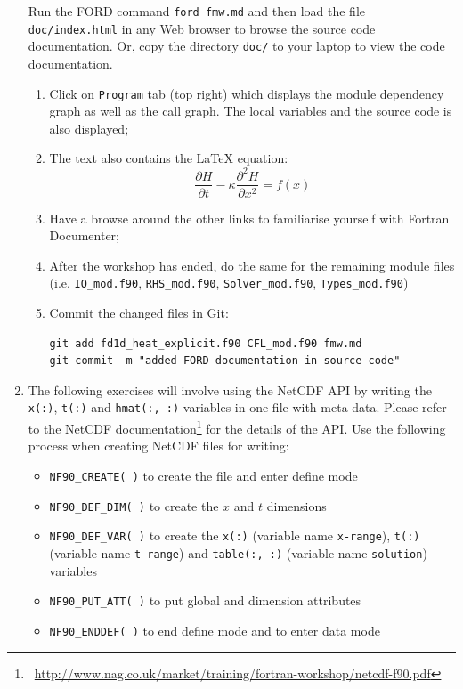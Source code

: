 \documentclass[12pt]{article}
\begin{document}
\begin{enumerate}
Run the FORD command \texttt{ford fmw.md} and then load the file \texttt{doc/index.html} in any Web browser
to browse the source code documentation. Or, copy the directory \texttt{doc/} to your laptop to view the
code documentation.
\begin{enumerate}
\item Click on \texttt{Program} tab (top right) which displays the module dependency graph as well as the call graph. The
  local variables and the source code is also displayed;
\item The text also contains the LaTeX equation:
\begin{equation}
\frac{\partial H}{\partial t} - \kappa\frac{\partial^{2} H}{\partial x^{2}} = f(x)
\end{equation}
\item Have a browse around the other links to familiarise yourself with Fortran Documenter;
\item After the workshop has ended, do the same for the remaining module files 
(i.e. \texttt{IO\_mod.f90}, \texttt{RHS\_mod.f90}, \texttt{Solver\_mod.f90}, \texttt{Types\_mod.f90})
\item Commit the changed files in Git:
\begin{verbatim}
git add fd1d_heat_explicit.f90 CFL_mod.f90 fmw.md
git commit -m "added FORD documentation in source code"
\end{verbatim}
\end{enumerate}
\item The following exercises will involve using the NetCDF API by writing the
  \texttt{x(:)}, \texttt{t(:)} and \texttt{hmat(:, :)} variables in one file with meta-data. 
Please refer to the NetCDF documentation\footnote{~\url{http://www.nag.co.uk/market/training/fortran-workshop/netcdf-f90.pdf}} for the details of the API. Use the following process when creating NetCDF files for writing:
\begin{itemize}
\item\texttt{NF90\_CREATE( )} to create the file and enter define mode
\item\texttt{NF90\_DEF\_DIM( )} to create the $x$ and $t$ dimensions
\item\texttt{NF90\_DEF\_VAR( )} to create the \texttt{x(:)} (variable name \texttt{x-range}), \texttt{t(:)} (variable name
  \texttt{t-range}) and \texttt{table(:, :)} (variable name \texttt{solution}) variables
\item\texttt{NF90\_PUT\_ATT( )} to put global and dimension attributes
\item\texttt{NF90\_ENDDEF( )} to end define mode and to enter data mode

\end{itemize}
\end{enumerate}
\end{document}

